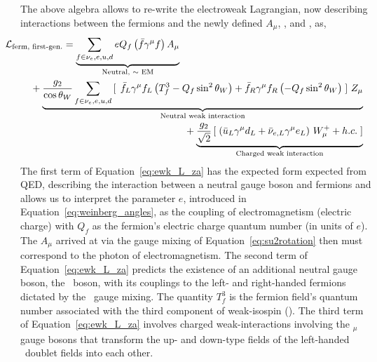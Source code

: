 The above algebra allows to re-write the electroweak Lagrangian, now
describing interactions between the fermions and the newly defined $A_{\mu}$, \fieldZ,
and \fieldWpm, as,
\begin{equation}
\begin{multlined}
\hspace{-0.9cm}\mathcal{L}_{\text{ferm, first-gen.}} = \underbrace{\sum\limits_{f \in \nu_e, e, u, d} e Q_f
\left(\bar{f}\gamma^{\mu} f \right) A_{\mu}}_\text{Neutral, $\sim$ EM}  \\
+ \underbrace{\frac{g_2}{\cos \theta_W} \sum\limits_{f \in \nu_e, e, u, d} \left[ \,\right.\bar{f}_L \gamma^{\mu} f_L
\left( T_f^3 -  Q_f \sin^2 \theta_W \right)
+ \bar{f}_R \gamma^{\mu} f_R \left(-Q_f \sin^2 \theta_W \right) \left. \right]\, Z_{\mu}}_\text{Neutral weak interaction} \\
+ \underbrace{\frac{g_2}{\sqrt{2}} \left[ \right. \left( \bar{u}_L \gamma^{\mu} d_L + \bar{\nu}_{e,L} \gamma^{\mu} e_L \right) \, W_{\mu}^+ + h.c. \left. \right]}_\text{Charged weak interaction}
\end{multlined}
\label{eq:ewk_L_za}
\end{equation}
The first term of Equation~\ref{eq:ewk_L_za} has the expected form expected from QED, describing the
interaction between a neutral gauge boson and fermions and allows us to interpret
the parameter $e$, introduced in Equation~\ref{eq:weinberg_angles}, as the coupling
of electromagnetism (electric charge) with $Q_f$ as the fermion's electric charge quantum number
(in units of $e$). The $A_{\mu}$ arrived at via the gauge mixing of Equation~\ref{eq:su2rotation}
then must correspond to the photon of electromagnetism.
The second term of Equation~\ref{eq:ewk_L_za} predicts the existence of an additional
neutral gauge boson, the \fieldZ~boson, with its couplings to the left- and right-handed
fermions dictated by the \SUewk~gauge mixing. The quantity $T_f^3$ is the fermion field's quantum
number associated with the third component of weak-isospin (\SUtwo).
The third term of Equation~\ref{eq:ewk_L_za} involves charged weak-interactions
involving the \fieldWpm$_{\mu}$ gauge bosons that transform the up- and down-type fields of
the left-handed \SUtwo~doublet fields into each other. 

